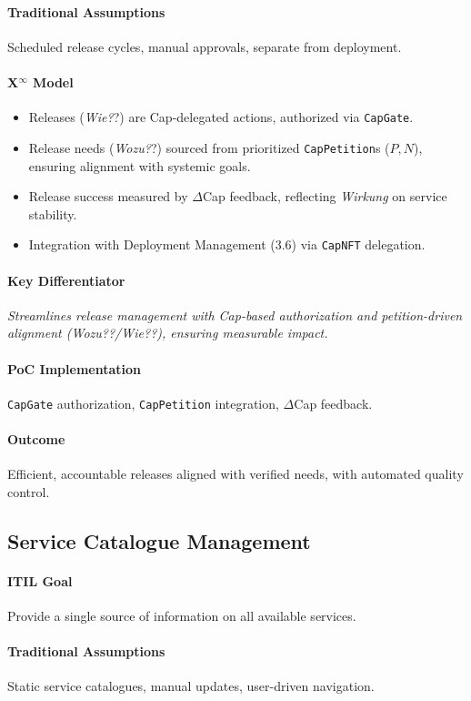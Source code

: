 \documentclass[12pt, a4paper]{scrartcl}
\newcommand{\Xinf}{X$^\infty$}                        %
\newcommand{\DeltaCap}{$\Delta$Cap}                    %
\newcommand{\Wirkung}{\textit{Wirkung}}                 %
\newcommand{\CapNFT}{\texttt{CapNFT}}
\newcommand{\CapGate}{\texttt{CapGate}}
\newcommand{\CapPetition}{\texttt{CapPetition}}        %
\newcommand{\Wozu}{\textit{Wozu?}}                      %
\newcommand{\Wie}{\textit{Wie?}}                        %
\begin{document}
\paragraph{Traditional Assumptions} Scheduled release cycles, manual approvals, separate from deployment.
\paragraph*{\Xinf{} Model}
\begin{itemize}
    \item Releases (\Wie?) are Cap-delegated actions, authorized via \CapGate{}.
    \item Release needs (\Wozu?) sourced from prioritized \CapPetition{}s ($P, N$), ensuring alignment with systemic goals.
    \item Release success measured by \DeltaCap{} feedback, reflecting \Wirkung{} on service stability.
    \item Integration with Deployment Management (3.6) via \CapNFT{} delegation.
\end{itemize}
\paragraph{Key Differentiator} \textit{Streamlines release management with Cap-based authorization and petition-driven alignment (\Wozu?/\Wie?), ensuring measurable impact.}
\paragraph{PoC Implementation} \CapGate{} authorization, \CapPetition{} integration, \DeltaCap{} feedback.
\paragraph{Outcome} Efficient, accountable releases aligned with verified needs, with automated quality control.

\subsection{Service Catalogue Management} %
\paragraph{ITIL Goal} Provide a single source of information on all available services.
\paragraph{Traditional Assumptions} Static service catalogues, manual updates, user-driven navigation.
\end{document}
